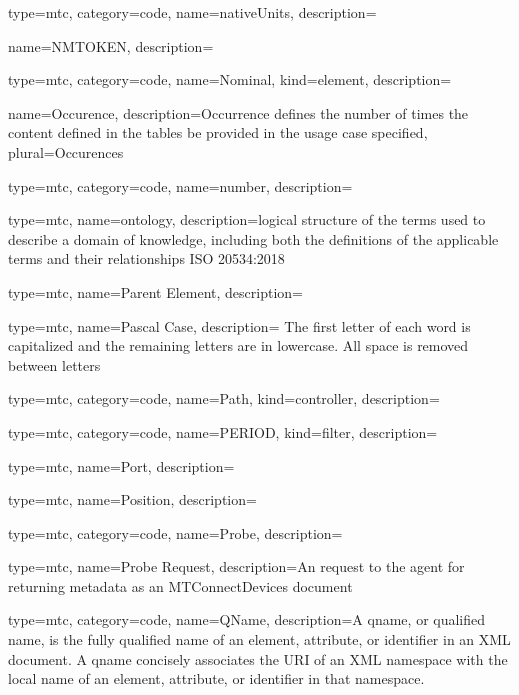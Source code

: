 {
  type=mtc,
  category=code,
  name={nativeUnits},
  description={}
}


{
  name={NMTOKEN},
  description={}
}


{
  type=mtc,
  category=code,
  name={Nominal},
  kind={element},
  description={}
}


{
  name={Occurence},
  description={Occurrence defines the number of times the content defined in the tables \MAY be provided in the usage case specified},
  plural={Occurences}
}


{
  type=mtc,
  category=code,
  name={number},
  description={}
}


{
  type=mtc,
  name=ontology,
  description={logical structure of the terms used to describe a domain of knowledge, including both the definitions of the applicable terms and their relationships ISO 20534:2018}
}


{
  type=mtc,
  name={Parent Element},
  description={}
}


{
  type=mtc,
  name={Pascal Case},
  description= {The first letter of each word is capitalized and the remaining letters are in lowercase. All space is removed between letters}
}


{
  type=mtc,
  category=code,
  name={Path},
  kind={controller},
  description= {}
}


{
  type=mtc,
  category=code,
  name={PERIOD},
  kind={filter},
  description={}
}


{
  type=mtc,
  name={Port},
  description={}
}


{
  type=mtc,
  name={Position},
  description={}
}


{
  type=mtc,
  category=code,
  name={Probe},
  description={}
}


{
  type=mtc,
  name={Probe Request},
  description={An  request to the \gls{agent} for returning metadata as an MTConnectDevices  document}
}


{
  type=mtc,
  category=code,
  name={QName},
  description={A \gls{qname}, or qualified name, is the fully qualified name of an element, attribute, or identifier in an XML document. A  \gls{qname} concisely associates the URI of an XML namespace with the local name of an element, attribute, or identifier in that namespace.}
}


